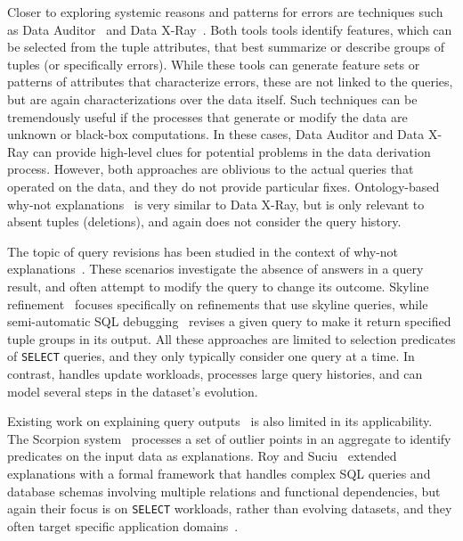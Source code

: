 Closer to exploring systemic reasons and patterns for errors are
techniques such as Data Auditor~\cite{Golab2008, GolabKKS10} and Data
X-Ray~\cite{wang2015}. Both tools tools identify features, which can
be selected from the tuple attributes, that best summarize or describe
groups of tuples (or specifically errors). While these tools can
generate feature sets or patterns of attributes that characterize
errors, these are not linked to the queries, but are again
characterizations over the data itself. Such techniques can be
tremendously useful if the processes that generate or modify the data
are unknown or black-box computations. In these cases, Data Auditor
and Data X-Ray can provide high-level clues for potential problems in
the data derivation process. However, both approaches are oblivious to
the actual queries that operated on the data, and they do not provide
particular fixes. Ontology-based why-not
explanations~\cite{tenCate2015} is very similar to Data X-Ray, but is
only relevant to absent tuples (deletions), and again does not
consider the query history.

The topic of query revisions has been studied in the context of
why-not explanations~\cite{Chapman2009}. These scenarios investigate
the absence of answers in a query result, and often attempt to modify
the query to change its outcome. Skyline
refinement~\cite{tran2010conquer} focuses specifically on refinements
that use skyline queries, while semi-automatic SQL
debugging~\cite{tzompanaki14semi} revises a given query to make it
return specified tuple groups in its output. All these approaches are
limited to selection predicates of \texttt{SELECT} queries, and they
only typically consider one query at a time. In contrast, \sys handles
update workloads, processes large query histories, and can model
several steps in the dataset's evolution.

Existing work on explaining query outputs~\cite{GebalyAGKS14} is also
limited in its applicability. The Scorpion system~\cite{Wu13}
processes a set of outlier points in an aggregate to identify
predicates on the input data as explanations. Roy and
Suciu~\cite{Roy2014} extended explanations with a formal framework
that handles complex SQL queries and database schemas involving
multiple relations and functional dependencies, but again their focus
is on \texttt{SELECT} workloads, rather than evolving datasets, and
they often target specific application domains~\cite{Khoussainova2012,
Thirumuruganathan2012, Das2011, Fabbri2011, Bender14}.

